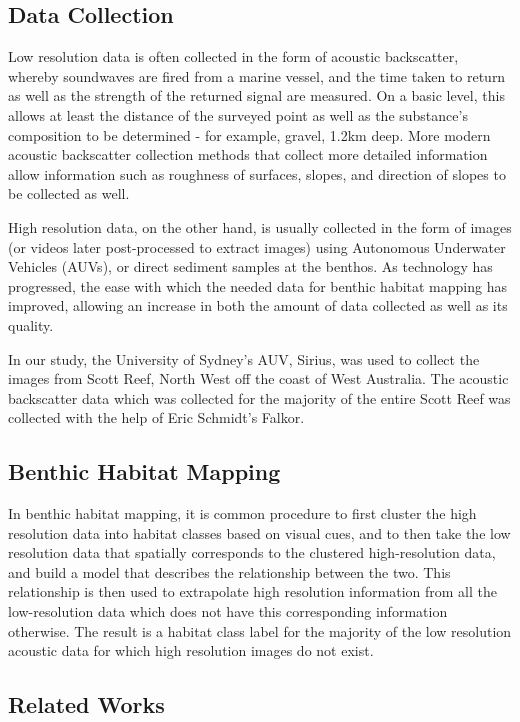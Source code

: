 \documentclass[10pt]{article}
\begin{document}
\begin{multicols}{2}
    \subsection{Data Collection}
    Low resolution data is often collected in the form of acoustic backscatter, whereby soundwaves are fired from a marine vessel, and the time taken to return as well as the strength of the returned signal are measured. On a basic level, this allows at least the distance of the surveyed point as well as the substance's composition to be determined - for example, gravel, 1.2km deep. More modern acoustic backscatter collection methods that collect more detailed information allow information such as roughness of surfaces, slopes, and direction of slopes to be collected as well. 
    
    High resolution data, on the other hand, is usually collected in the form of images (or videos later post-processed to extract images) using Autonomous Underwater Vehicles (AUVs), or direct sediment samples at the benthos. As technology has progressed, the ease with which the needed data for benthic habitat mapping has improved, allowing an increase in both the amount of data collected as well as its quality. 
    
    In our study, the University of Sydney's AUV, Sirius, was used to collect the images from Scott Reef, North West off the coast of West Australia. The acoustic backscatter data which was collected for the majority of the entire Scott Reef was collected with the help of Eric Schmidt's Falkor.

    \subsection{Benthic Habitat Mapping}

    In benthic habitat mapping, it is common procedure to first cluster the high resolution data into habitat classes based on visual cues, and to then take the low resolution data that spatially corresponds to the clustered high-resolution data, and build a model that describes the relationship between the two. This relationship is then used to extrapolate high resolution information from all the low-resolution data which does not have this corresponding information otherwise. The result is a habitat class label for the majority of the low resolution acoustic data for which high resolution images do not exist. 

    \subsection{Related Works}


\end{multicols}
\end{document}
